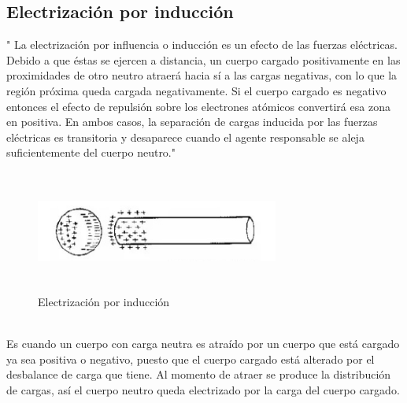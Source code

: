 \subsection{Electrización por inducción}
" La electrización por influencia o inducción es un efecto de las fuerzas eléctricas. Debido a que éstas se ejercen a distancia, un cuerpo cargado positivamente en las proximidades de otro neutro atraerá hacia sí a las cargas negativas, con lo que la región próxima queda cargada negativamente. Si el cuerpo cargado es negativo entonces el efecto de repulsión sobre los electrones atómicos convertirá esa zona en positiva. En ambos casos, la separación de cargas inducida por las fuerzas eléctricas es transitoria y desaparece cuando el agente responsable se aleja suficientemente del cuerpo neutro."  \cite{etitudela2016}
\begin{figure}[h]
	\centering
	\includegraphics[width=8cm, height=4cm]{imagenes/induccion.jpg}
	\caption{Electrización por inducción}
\end{figure}\\
Es cuando un cuerpo con carga neutra es atraído por un cuerpo que está cargado ya sea positiva o negativo, puesto que el cuerpo cargado está alterado por el desbalance de carga que tiene. Al momento de atraer se produce la distribución de cargas, así el cuerpo neutro queda electrizado por la carga del cuerpo cargado.

